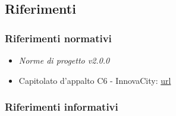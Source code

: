 \subsection{Riferimenti}
\subsubsection{Riferimenti normativi}
\begin{itemize}
    \item \textit{Norme di progetto v2.0.0}
    \item Capitolato d'appalto C6 - InnovaCity: \href{url}{url}
\end{itemize}

\subsubsection{Riferimenti informativi}
